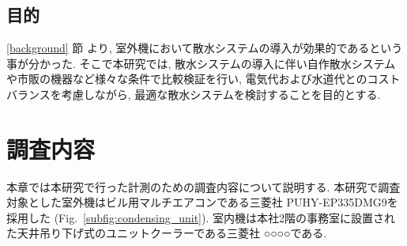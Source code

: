 \documentclass[a4j,fleqn,dvipdfmx,uplatex]{jsarticle}
\newcommand{\figref}[1]{Fig.\ \ref{#1}}
\newcommand{\subsecref}[1]{\ref{#1}\hspace{0.2zw} 節}
\begin{document}
\subsection{目的}\label{purpose}
\subsecref{background} より, 室外機において散水システムの導入が効果的であるという事が分かった. 
そこで本研究では, 散水システムの導入に伴い自作散水システムや市販の機器など様々な条件で比較検証を行い, 
電気代および水道代とのコストバランスを考慮しながら, 最適な散水システムを検討することを目的とする. 

\section{調査内容}\label{sec2}
本章では本研究で行った計測のための調査内容について説明する. 
本研究で調査対象とした室外機はビル用マルチエアコンである三菱社 
PUHY-EP335DMG9を採用した (\figref{subfig:condensing_unit}). 
室内機は本社2階の事務室に設置された天井吊り下げ式のユニットクーラーである三菱社 
○○○○である. 
\end{document}
